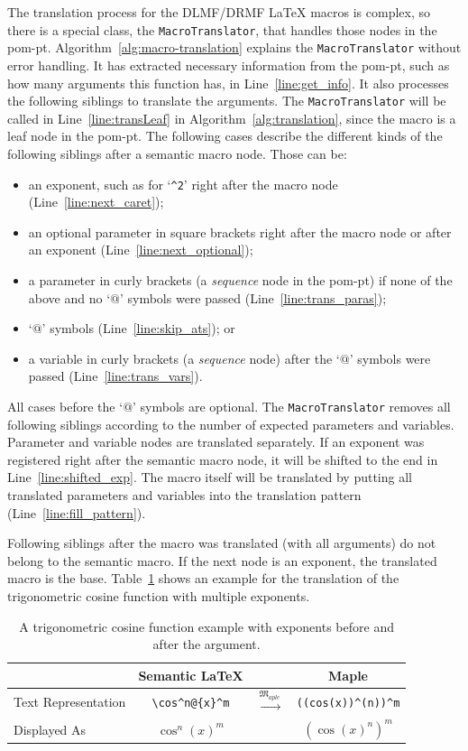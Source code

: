 \documentclass[a4paper,11pt]{article}
\newcommand{\DLMF}{DLMF}
\newcommand{\DRMF}{DRMF}
\newcommand{\Maple}{Maple}
\newcommand{\Macro}{\DLMF/\DRMF{} \LaTeX{} macro}
\newcommand{\langMaple}{\mathfrak{M}_{aple}}
\theoremstyle{defTheoStyle}
\theoremstyle{defExampStyle}
\begin{document}
The translation process for the \Macro s is complex, so there is a special class, the \verb|MacroTranslator|, that handles those nodes in the \gls*{pom-pt}. Algorithm~\ref{alg:macro-translation} explains the \verb|MacroTranslator| without error handling. It has extracted necessary information from the \gls*{pom-pt}, such as how many arguments this function has, in Line~\ref{line:get_info}. It also processes the following siblings to translate the arguments. The \verb|MacroTranslator| will be called in Line~\ref{line:transLeaf} in Algorithm~\ref{alg:translation}, since the macro is a leaf node in the \gls*{pom-pt}. The following cases describe the different kinds of the following siblings after a semantic macro node. Those can be:
\begin{itemize}
\item an exponent, such as for `\verb|^2|' right after the macro node (Line~\ref{line:next_caret});
\item an optional parameter in square brackets right after the macro node or after an exponent (Line~\ref{line:next_optional});
\item a parameter in curly brackets (a \textit{sequence} node in the \gls*{pom-pt}) if none of the above and no `$@$' symbols were passed (Line~\ref{line:trans_paras});
\item `$@$' symbols (Line~\ref{line:skip_ats}); or
\item a variable in curly brackets (a \textit{sequence} node) after the `$@$' symbols were 
passed (Line~\ref{line:trans_vars}).
\end{itemize}

All cases before the `$@$' symbols are optional. The \verb|MacroTranslator| removes all following siblings according to the number of expected parameters and variables. Parameter and variable nodes are translated separately. If an exponent was registered right after the semantic macro node, it will be shifted to the end in Line~\ref{line:shifted_exp}. The macro itself will be translated by putting all translated parameters and variables into the translation pattern (Line~\ref{line:fill_pattern}).

Following siblings after the macro was translated (with all arguments) do not belong to the semantic macro. If the next node is an exponent, the translated macro is the base. Table~\ref{tab:multi-expo} shows an example for the translation of the trigonometric cosine function with multiple exponents.

\begin{table}[ht]
\centering
\begin{tabular}{lccc}
 & Semantic \LaTeX & & \Maple{} \\
\hline
Text Representation & \rule{0pt}{1.0\normalbaselineskip} \verb|\cos^n@{x}^m| & $\overset{\langMaple}{\mapsto}$ & \verb|((cos(x))^(n))^m| \\
Displayed As & \rule{0pt}{1.0\normalbaselineskip} $\cos^n(x)^m$ & & $\left( \cos(x)^n \right)^m$ \\
\hline
\end{tabular}
\caption{A trigonometric cosine function example with exponents before and after the argument.}
\label{tab:multi-expo}
\end{table}
\end{document}
